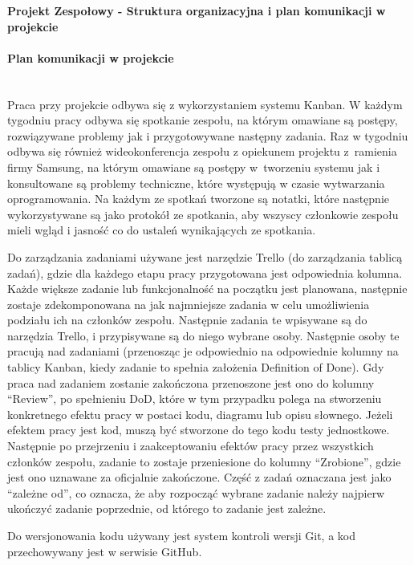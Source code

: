 \documentclass{article}
\begin{document}
\begin{center}
\textbf{Projekt Zespołowy - Struktura organizacyjna i plan komunikacji w projekcie}
\end{center}

\paragraph{Plan komunikacji w projekcie}\mbox{}\\

Praca przy projekcie odbywa się z wykorzystaniem systemu Kanban. W każdym tygodniu pracy odbywa się spotkanie zespołu, na którym omawiane są postępy, rozwiązywane problemy jak i przygotowywane następny zadania. Raz w tygodniu odbywa się również wideokonferencja zespołu z opiekunem projektu z~ramienia firmy Samsung, na którym omawiane są postępy w~tworzeniu systemu jak i konsultowane są problemy techniczne, które występują w czasie wytwarzania oprogramowania. 
Na każdym ze spotkań tworzone są notatki, które następnie wykorzystywane są jako protokół ze spotkania, aby wszyscy członkowie zespołu mieli wgląd i jasność co do ustaleń wynikających ze spotkania. 

Do zarządzania zadaniami \nobreak używane jest narzędzie Trello (do zarządzania tablicą zadań), gdzie dla każdego etapu pracy przygotowana jest \nobreak odpowiednia kolumna. Każde większe zadanie lub funkcjonalność na początku jest planowana, następnie zostaje zdekomponowana na jak najmniejsze zadania w celu umożliwienia podziału ich na członków zespołu. \nobreak Następnie zadania te wpisywane są do narzędzia Trello, i przypisywane są do niego wybrane osoby. Następnie osoby te pracują nad zadaniami (przenosząc je odpowiednio na odpowiednie kolumny na tablicy Kanban, kiedy zadanie to spełnia założenia Definition of Done). Gdy praca nad zadaniem zostanie zakończona przenoszone jest ono do kolumny “Review”, po spełnieniu DoD, które w tym przypadku polega na stworzeniu konkretnego efektu pracy w postaci kodu, diagramu lub opisu słownego. Jeżeli efektem pracy jest kod, muszą być stworzone do tego kodu testy jednostkowe. Następnie po przejrzeniu i zaakceptowaniu efektów pracy przez wszystkich członków zespołu, zadanie to zostaje przeniesione do kolumny “Zrobione”, gdzie jest ono uznawane za oficjalnie zakończone. Część z zadań oznaczana jest jako “zależne od”, co oznacza, że aby rozpocząć wybrane zadanie należy najpierw ukończyć zadanie poprzednie, od którego to zadanie jest zależne. 

Do wersjonowania kodu używany jest system kontroli wersji Git, a kod przechowywany jest w serwisie GitHub.
\end{document}

